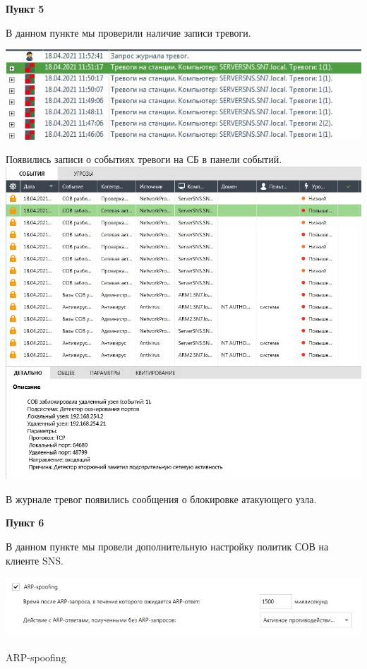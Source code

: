 \documentclass[a4paper,14pt]{extarticle}
\begin{document}
    \textbf{Пункт 5}
    \vspace{-3ex}
    \begin{center}
        \singlespacing
        В данном пункте мы проверили наличие записи тревоги. 

        \includegraphics[scale=0.6]{pics/5_1.jpg}

        Появились записи о событиях тревоги на СБ в панели событий.
        \includegraphics[scale=0.45]{pics/5_2.jpg}

        В журнале тревог появились сообщения о блокировке атакующего узла.

    \end{center}

    \newpage
    \textbf{Пункт 6}
    \vspace{-3ex}
    \begin{center}
        \singlespacing
        В данном пункте мы провели дополнительную настройку политик СОВ на клиенте SNS.

        \includegraphics[scale=0.6]{pics/6.jpg}


        ARP-spoofing
    \end{center}
\end{document}
